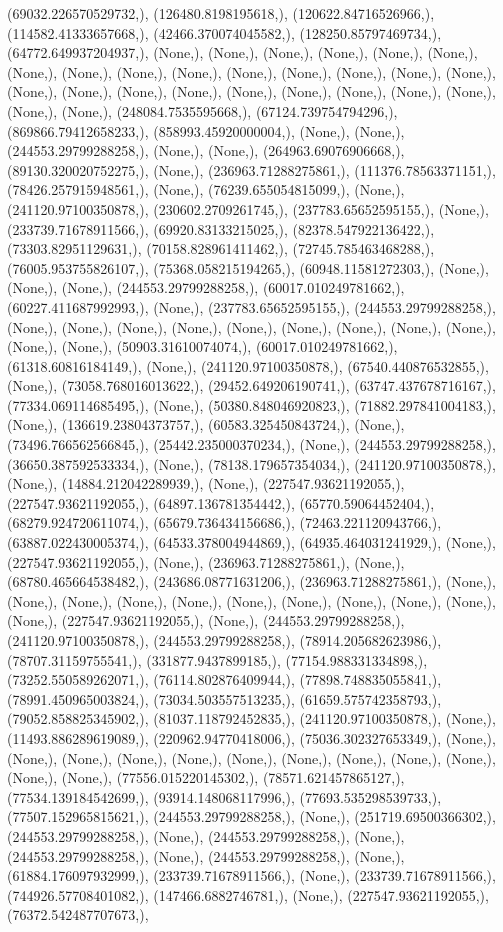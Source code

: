\documentclass{article}
\begin{document}
(69032.226570529732,), (126480.8198195618,), (120622.84716526966,), (114582.41333657668,), (42466.370074045582,), (128250.85797469734,), (64772.649937204937,), (None,), (None,), (None,), (None,), (None,), (None,), (None,), (None,), (None,), (None,), (None,), (None,), (None,), (None,), (None,), (None,), (None,), (None,), (None,), (None,), (None,), (None,), (None,), (None,), (None,), (None,), (248084.7535595668,), (67124.739754794296,), (869866.79412658233,), (858993.45920000004,), (None,), (None,), (244553.29799288258,), (None,), (None,), (264963.69076906668,), (89130.320020752275,), (None,), (236963.71288275861,), (111376.78563371151,), (78426.257915948561,), (None,), (76239.655054815099,), (None,), (241120.97100350878,), (230602.2709261745,), (237783.65652595155,), (None,), (233739.71678911566,), (69920.83133215025,), (82378.547922136422,), (73303.82951129631,), (70158.828961411462,), (72745.785463468288,), (76005.953755826107,), (75368.058215194265,), (60948.11581272303,), (None,), (None,), (None,), (244553.29799288258,), (60017.010249781662,), (60227.411687992993,), (None,), (237783.65652595155,), (244553.29799288258,), (None,), (None,), (None,), (None,), (None,), (None,), (None,), (None,), (None,), (None,), (None,), (50903.31610074074,), (60017.010249781662,), (61318.60816184149,), (None,), (241120.97100350878,), (67540.440876532855,), (None,), (73058.768016013622,), (29452.649206190741,), (63747.437678716167,), (77334.069114685495,), (None,), (50380.848046920823,), (71882.297841004183,), (None,), (136619.23804373757,), (60583.325450843724,), (None,), (73496.766562566845,), (25442.235000370234,), (None,), (244553.29799288258,), (36650.387592533334,), (None,), (78138.179657354034,), (241120.97100350878,), (None,), (14884.212042289939,), (None,), (227547.93621192055,), (227547.93621192055,), (64897.136781354442,), (65770.59064452404,), (68279.924720611074,), (65679.736434156686,), (72463.221120943766,), (63887.022430005374,), (64533.378004944869,), (64935.464031241929,), (None,), (227547.93621192055,), (None,), (236963.71288275861,), (None,), (68780.465664538482,), (243686.08771631206,), (236963.71288275861,), (None,), (None,), (None,), (None,), (None,), (None,), (None,), (None,), (None,), (None,), (None,), (227547.93621192055,), (None,), (244553.29799288258,), (241120.97100350878,), (244553.29799288258,), (78914.205682623986,), (78707.31159755541,), (331877.9437899185,), (77154.988331334898,), (73252.550589262071,), (76114.802876409944,), (77898.748835055841,), (78991.450965003824,), (73034.503557513235,), (61659.575742358793,), (79052.858825345902,), (81037.118792452835,), (241120.97100350878,), (None,), (11493.886289619089,), (220962.94770418006,), (75036.302327653349,), (None,), (None,), (None,), (None,), (None,), (None,), (None,), (None,), (None,), (None,), (None,), (None,), (77556.015220145302,), (78571.621457865127,), (77534.139184542699,), (93914.148068117996,), (77693.535298539733,), (77507.152965815621,), (244553.29799288258,), (None,), (251719.69500366302,), (244553.29799288258,), (None,), (244553.29799288258,), (None,), (244553.29799288258,), (None,), (244553.29799288258,), (None,), (61884.176097932999,), (233739.71678911566,), (None,), (233739.71678911566,), (744926.57708401082,), (147466.6882746781,), (None,), (227547.93621192055,), (76372.542487707673,), 
\end{document}
